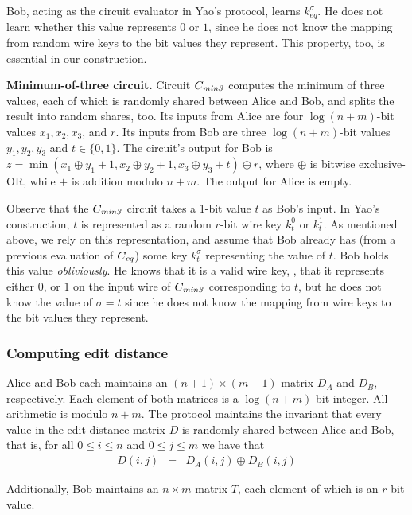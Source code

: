 Bob, acting as the circuit evaluator in Yao's protocol, learns
$k^{\sigma}_{\mathit{eq}}$.  He does not learn whether this value
represents $0$ or $1$, since he does not know the mapping from random
wire keys to the bit values they represent.
This property, too, is essential in our construction.

\vspace{1ex}
\noindent
\textbf{Minimum-of-three circuit.}
Circuit $C_{\mathit{min3}}$ computes the minimum of three values, each of which is
randomly shared between Alice and Bob, and splits the result into random
shares, too.  Its inputs from Alice are four $\log(n+m)$-bit values
$x_1, x_2, x_3$, and $r$.  Its inputs from Bob are three $\log(n+m)$-bit
values $y_1, y_2, y_3$ and $t \in \{0,1\}$.  The circuit's output for
Bob is $z = \min(x_1 \oplus y_1 + 1, x_2 \oplus y_2+1, x_3 \oplus y_3+t)
\oplus r$, where $\oplus$ is bitwise exclusive-OR, while $+$ is addition
modulo $n+m$.  The output for Alice is empty.


Observe that the $C_{\mathit{min3}}$ circuit takes a 1-bit value $t$ as Bob's input.
In Yao's construction, $t$ is represented as a random $r$-bit wire key
$k^0_t$ or $k^1_t$.  As mentioned above, we rely on this representation,
and assume that Bob already has (from a previous evaluation of $C_{\mathit{eq}}$)
some key $k^{\sigma}_t$ representing the value of $t$.  Bob holds this
value \emph{obliviously}.  He knows that it is a valid wire key, \ie, that
it represents either $0$, or $1$ on the input wire of $C_{\mathit{min3}}$ corresponding
to $t$, but he does not know the value of $\sigma=t$ since he does not
know the mapping from wire keys to the bit values they represent.


\subsubsection{Computing edit distance}

Alice and Bob each maintains an $(n+1) \times (m+1)$ matrix $D_A$ and
$D_B$, respectively.  Each element of both matrices is a $\log(n+m)$-bit
integer.  All arithmetic is modulo $n+m$.
The protocol maintains the invariant that every value in the edit
distance matrix $D$ is randomly shared between Alice and Bob, that is,
for all $0 \leq i \leq n$ and $0 \leq j \leq m$ we have that
\begin{eqnarray*}
D(i,j) & = & D_A(i,j) \oplus D_B(i,j)
\end{eqnarray*}

Additionally, Bob maintains an $n \times m$ matrix $T$, each element of
which is an $r$-bit value.

